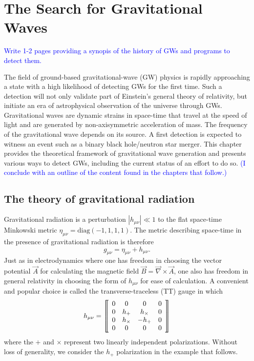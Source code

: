\chapter{The Search for Gravitational Waves}

\textcolor{blue}{Write 1-2 pages providing a synopis of the history of
GWs and programs to detect them.}

The field of ground-based gravitational-wave (GW) physics is rapidly
approaching a state with a high likelihood of detecting GWs for the
first time. Such a detection will not only validate part of Einstein's
general theory of relativity, but initiate an era of astrophysical
observation of the universe through GWs. Gravitational waves are
dynamic strains in space-time that travel at the speed of light and
are generated by non-axisymmetric acceleration of mass. The frequency
of the gravitational wave depends on its source. A first detection is
expected to witness an event such as a binary black hole/neutron star
merger. This chapter provides the theoretical framework of
gravitational wave generation and presents various ways to detect GWs,
including the current status of an effort to do
so. \textcolor{blue}{(I conclude with an outline of the content found
  in the chapters that follow.)}


\section{The theory of gravitational radiation}
Gravitational radiation is a perturbation $|h_{\mu \nu}|
\ll 1$ to the flat space-time Minkowski metric $\eta_{\mu \nu} =
\mbox{diag}(-1, 1, 1, 1)$. The metric describing space-time in the
presence of gravitational radiation is therefore
\begin{equation}
g_{\mu\nu} = \eta_{\mu\nu} + h_{\mu\nu}.
\end{equation}
Just as in electrodynamics where one has freedom in choosing the
vector potential $\vec{A}$ for calculating the magnetic field $\vec{B}
= \vec{\nabla} \times \vec{A}$, one also has freedom in general
relativity in choosing the form of $h_{\mu \nu}$ for ease of calculation. A
convenient and popular choice is called the transverse-traceless (TT)
gauge in which
\begin{equation}
h_{\mu \nu} = 
\left\llbracket \begin{array}{c c c c} 
0 & 0 & 0 & 0\\ 
0 & h_+ & h_\times & 0 \\
0 & h_\times & -h_+ & 0 \\
0 & 0 & 0 & 0
\end{array} \right\rrbracket
\end{equation}
where the $+$ and $\times$ represent two linearly independent
polarizations. Without loss of generality, we consider the $h_+$
polarization in the example that follows.

